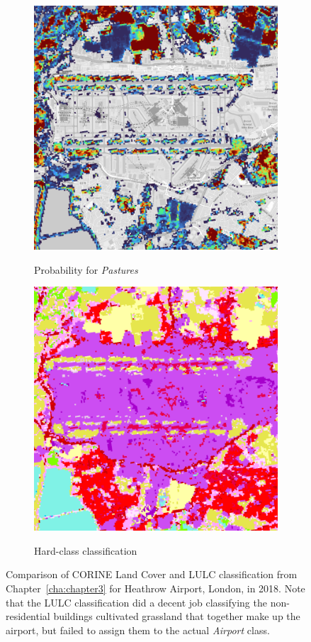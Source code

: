 \begin{figure}[H]
        \begin{subfigure}[b]{0.48\textwidth}
            \centering
            \caption{Probability for \textit{Pastures}}
            \includegraphics[width=\textwidth,height=0.7\textwidth]{figs_06/heathrow_p_pastures.png}
            \label{fig:heathrow_industrial-commercial}
        \end{subfigure}
        \hfill
        \begin{subfigure}[b]{0.48\textwidth}
            \centering
            \caption{Hard-class classification}
            \includegraphics[width=\textwidth,height=0.7\textwidth]{figs_06/heathrow_lulc.png}
            \label{fig:heathrow_industrial-commercial}
        \end{subfigure}
        \label{fig:airport_grass}
        \caption{Comparison of CORINE Land Cover and LULC classification from Chapter\@~\ref{cha:chapter3} for Heathrow Airport, London, in 2018. Note that the LULC classification did a decent job classifying the non-residential buildings cultivated grassland that together make up the airport, but failed to assign them to the actual \textit{Airport} class.}
        
        \end{figure}

